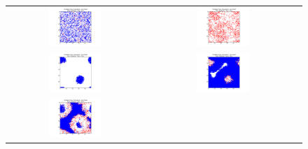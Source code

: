 \documentclass[a4paper,12pt]{article}
\begin{document}
  \begin{figure}[H]
  \centering
        \begin{tabular}{@{}cc@{}cc@{}}
		 \includegraphics[width = 0.4\textwidth]{./pics/ecosystem_snapshot_1.png} &&
		 \includegraphics[width = 0.4\textwidth]{./pics/ecosystem_snapshot_50.png} \\
		 \includegraphics[width = 0.4\textwidth]{./pics/ecosystem_snapshot_100.png} &&
		 \includegraphics[width = 0.4\textwidth]{./pics/ecosystem_snapshot_150.png} \\
		 \includegraphics[width = 0.4\textwidth]{./pics/ecosystem_snapshot_200.png} &&

\end{tabular}
\end{figure}
\end{document}
